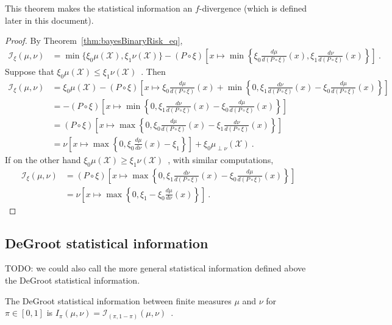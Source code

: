 This theorem makes the statistical information an $f$-divergence (which is defined later in this document).

\begin{proof}%
{}
By Theorem~\ref{thm:bayesBinaryRisk_eq},
\begin{align*}
\mathcal I_\xi(\mu, \nu)
&= \min\{\xi_0\mu(\mathcal X), \xi_1\nu(\mathcal X)\} - (P \circ \xi)\left[x \mapsto \min \left\{\xi_0\frac{d \mu}{d(P \circ \xi)}(x), \xi_1\frac{d \nu}{d(P \circ \xi)}(x)\right\}\right]
\: .
\end{align*}
Suppose that $\xi_0\mu(\mathcal X) \le \xi_1\nu(\mathcal X)$~. Then
\begin{align*}
\mathcal I_\xi(\mu, \nu)
&= \xi_0\mu(\mathcal X) - (P \circ \xi)\left[x \mapsto \xi_0\frac{d \mu}{d(P \circ \xi)}(x) + \min \left\{0 , \xi_1\frac{d \nu}{d(P \circ \xi)}(x) - \xi_0\frac{d \mu}{d(P \circ \xi)}(x)\right\}\right]
\\
&= - (P \circ \xi)\left[x \mapsto \min \left\{0 , \xi_1\frac{d \nu}{d(P \circ \xi)}(x) - \xi_0\frac{d \mu}{d(P \circ \xi)}(x) \right\}\right]
\\
&= (P \circ \xi)\left[x \mapsto \max \left\{0 , \xi_0\frac{d \mu}{d(P \circ \xi)}(x) - \xi_1\frac{d \nu}{d(P \circ \xi)}(x) \right\}\right]
\\
&= \nu\left[ x \mapsto \max \left\{0 , \xi_0\frac{d \mu}{d\nu}(x) - \xi_1 \right\} \right] + \xi_0 \mu_{\perp \nu}(\mathcal X)
\: .
\end{align*}
If on the other hand $\xi_0\mu(\mathcal X) \ge \xi_1\nu(\mathcal X)$~, with similar computations,
\begin{align*}
\mathcal I_\xi(\mu, \nu)
&= (P \circ \xi)\left[x \mapsto \max \left\{0 , \xi_1\frac{d \nu}{d(P \circ \xi)}(x) - \xi_0\frac{d \mu}{d(P \circ \xi)}(x) \right\}\right]
\\
&= \nu\left[ x \mapsto \max \left\{0 , \xi_1 - \xi_0\frac{d \mu}{d\nu}(x) \right\} \right]
\: .
\end{align*}
\end{proof}


\subsection{DeGroot statistical information}

TODO: we could also call the more general statistical information defined above the DeGroot statistical information.

\begin{definition}
  \label{def:deGrootInfo}
  \leanok
  The DeGroot statistical information between finite measures $\mu$ and $\nu$ for $\pi \in [0,1]$ is $I_\pi(\mu, \nu) = \mathcal I_{(\pi, 1 - \pi)}(\mu, \nu)$~.
\end{definition}

